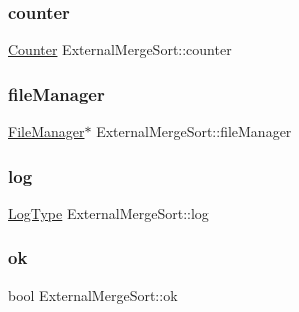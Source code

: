 \subsubsection{\texorpdfstring{counter}{counter}}
{\footnotesize\ttfamily \hyperlink{class_counter}{Counter} External\+Merge\+Sort\+::counter}

\hypertarget{class_external_merge_sort_ab82d3b62a57be6c80dbd12b90de278e2}{}\label{class_external_merge_sort_ab82d3b62a57be6c80dbd12b90de278e2} 
\subsubsection{\texorpdfstring{file\+Manager}{fileManager}}
{\footnotesize\ttfamily \hyperlink{class_file_manager}{File\+Manager}$\ast$ External\+Merge\+Sort\+::file\+Manager\hspace{0.3cm}{\ttfamily [private]}}

\hypertarget{class_external_merge_sort_a41f61c3beb7dc529d7f2a8b2b4ee380b}{}\label{class_external_merge_sort_a41f61c3beb7dc529d7f2a8b2b4ee380b} 
\subsubsection{\texorpdfstring{log}{log}}
{\footnotesize\ttfamily \hyperlink{_structures_8h_af67907baa897e9fb84df0cb89795b87c}{Log\+Type} External\+Merge\+Sort\+::log\hspace{0.3cm}{\ttfamily [private]}}

\hypertarget{class_external_merge_sort_a4b050cd230e144a11f65e57523e15ce6}{}\label{class_external_merge_sort_a4b050cd230e144a11f65e57523e15ce6} 
\subsubsection{\texorpdfstring{ok}{ok}}
{\footnotesize\ttfamily bool External\+Merge\+Sort\+::ok\hspace{0.3cm}{\ttfamily [private]}}

\hypertarget{class_external_merge_sort_a1d68bb5e0373cf16807a41272dff1a99}{}\label{class_external_merge_sort_a1d68bb5e0373cf16807a41272dff1a99} 
